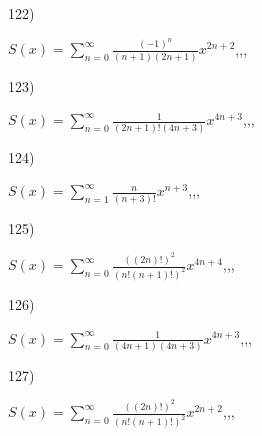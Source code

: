 \documentclass[11pt, ukrainian]{article}
\begin{document}
\par
\vspace{0.9cm}
122) \space 
{%
{$S(x)=\sum\limits_{n=0}^{\infty}{\frac{(-1)^n}{(n+1)(2n+1)}}{x^{{2n+2}}}$},,, \par \smallskip  
}
\par
\vspace{0.9cm}
123) \space 
{%
{$S(x)=\sum\limits_{n=0}^{\infty}{\frac{1}{(2n+1)!(4n+3)}}{x^{{4n+3}}}$},,, \par \smallskip  
}
\par
\vspace{0.9cm}
124) \space 
{%
{$S(x)=\sum\limits_{n=1}^{\infty}{\frac{n}{(n+3)!}}{x^{{n+3}}}$},,, \par \smallskip  
}
\par
\vspace{0.9cm}
125) \space 
{%
{$S(x)=\sum\limits_{n=0}^{\infty}{\frac{((2n)!)^2}{(n!(n+1)!)^2}}{x^{{4n+4}}}$},,, \par \smallskip  
}
\par
\vspace{0.9cm}
126) \space 
{%
{$S(x)=\sum\limits_{n=0}^{\infty}{\frac{1}{(4n+1)(4n+3)}}{x^{{4n+3}}}$},,, \par \smallskip  
}
\par
\vspace{0.9cm}
127) \space 
{%
{$S(x)=\sum\limits_{n=0}^{\infty}{\frac{((2n)!)^2}{(n!(n+1)!)^2}}{x^{{2n+2}}}$},,, \par \smallskip  
}
\end{document}
